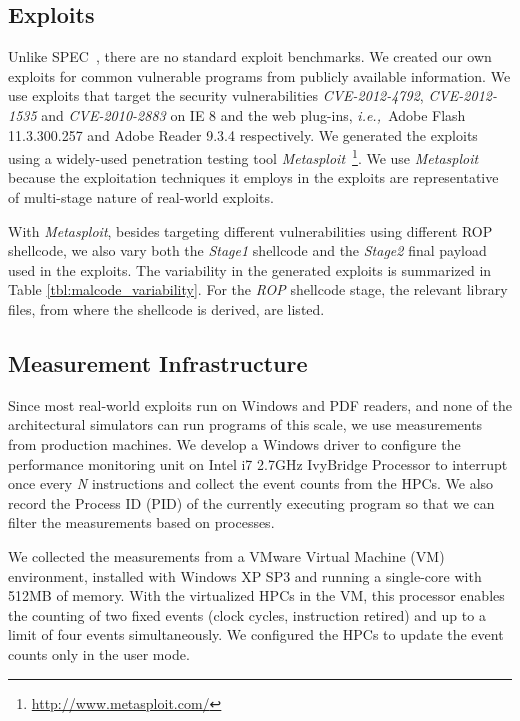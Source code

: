 \documentclass{acm_proc_article-sp}
\newcommand{\ie}[0]{{\it i.e.,\ }}
\begin{document}
\subsection{Exploits}

Unlike SPEC~\cite{Henning:2006:SCB:1186736.1186737}, there are no standard exploit benchmarks.  We created
our own exploits for common vulnerable programs from publicly
available information.  We use exploits that target the security
vulnerabilities \textit{CVE-2012-4792}, \textit{CVE-2012-1535} and
\textit{CVE-2010-2883} on IE 8 and the web plug-ins, \ie  Adobe
Flash 11.3.300.257 and Adobe Reader 9.3.4 respectively.  We generated
the exploits using a widely-used penetration testing tool
\textit{Metasploit}~\footnote{\url{http://www.metasploit.com/}}. We use \textit{Metasploit}
because the exploitation techniques it employs in the exploits are
representative of multi-stage nature of real-world exploits.

With \textit{Metasploit}, besides targeting different vulnerabilities
using different ROP shellcode, we also vary both the \textit{Stage1}
shellcode and the \textit{Stage2} final payload used in the exploits.
The variability in the generated exploits is summarized in Table
\ref{tbl:malcode_variability}. For the \textit{ROP} shellcode stage,
the relevant library files, from where the shellcode is derived,
are listed.

\subsection{Measurement Infrastructure}
\label{sec:m_infra}

Since most real-world exploits run on Windows and PDF readers,
and none of the architectural simulators can run programs of this
scale, we use measurements from production machines.  We develop
a Windows driver to configure the performance monitoring unit on
Intel i7 2.7GHz IvyBridge Processor to interrupt once every \textit{N}
instructions and collect the event counts from the HPCs. We also 
record the Process ID (PID) of the currently executing program so 
that we can filter the measurements based on processes.  

We collected the measurements from a VMware Virtual Machine (VM)
environment, installed with Windows XP SP3 and running a single-core
with 512MB of memory. With the virtualized HPCs in the VM, this
processor enables the counting of two fixed events (clock cycles,
instruction retired) and up to a limit of four events simultaneously.
We configured the HPCs to update the event counts only in the user
mode.
\end{document}
